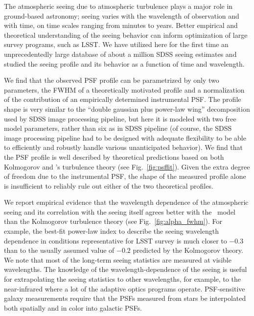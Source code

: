 
 
The atmospheric seeing due to atmospheric turbulence plays a major role in 
ground-based astronomy; seeing varies with the wavelength of observation
and with time, on time scales ranging from minutes to years. Better empirical
and theoretical understanding of the seeing behavior can inform optimization 
of large survey programs, such as LSST. We have utilized here for the first 
time an unprecedentedly large database of about a million SDSS seeing estimates
and studied the seeing profile and its behavior as a function of time and wavelength.

We find that the observed PSF profile can be parametrized by only two parameters, 
the FWHM of a theoretically motivated profile and a normalization of the contribution 
of an empirically determined instrumental PSF. The profile shape is very similar to 
the ``double gaussian plus power-law wing'' decomposition used by SDSS image
processing pipeline, but here it is modeled with two free model parameters, rather 
than six as in SDSS pipeline (of course, the SDSS image processing pipeline had
to be designed with adequate flexibility to be able to efficiently and robustly 
handle various unanticipated behavior). We find that the PSF profile is well 
described by theoretical predictions based on both 
Kolmogorov and \vk's turbulence theory (see Fig.~\ref{fig:psffit}). Given the extra 
degree of freedom due to the instrumental PSF, the shape of the measured profile alone 
is insufficient to reliably rule out either of the two theoretical profiles.  

We report empirical evidence that the wavelength dependence of the atmospheric 
seeing and its correlation with the seeing itself agrees better with the \vk~model 
than the Kolmogorov turbulence theory (see Fig.~\ref{fig:alpha_fwhm}). For example, 
the best-fit power-law index to describe the seeing wavelength dependence in conditions 
representative for LSST survey is much closer to $-0.3$ than to the usually assumed value
of $-0.2$ predicted by the Kolmogorov theory. 
We note that most of the long-term seeing statistics are measured at visible 
wavelengths. The knowledge of the wavelength-dependence of the seeing is useful 
for extrapolating the seeing statistics to other wavelengths, for example, to
the near-infrared where a lot of the adaptive optics programs operate. 
PSF-sensitive galaxy measurements require that the PSFs measured from
stars be interpolated both spatially and in color into galactic PSFs.

